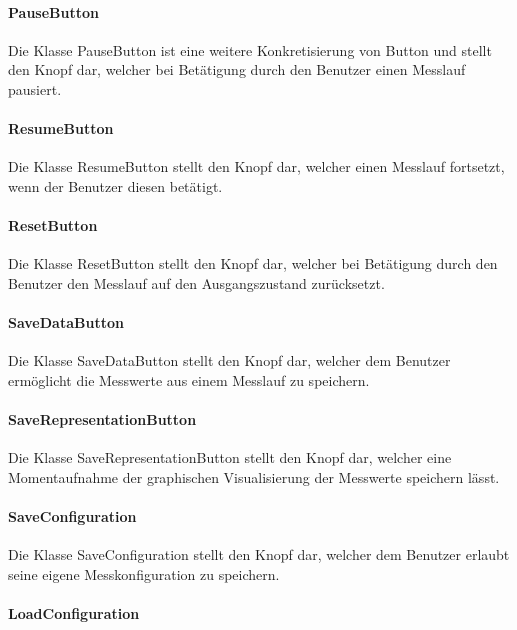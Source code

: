 \documentclass[parskip=full]{scrartcl}
\begin{document}
\paragraph{PauseButton}

Die Klasse PauseButton ist eine weitere Konkretisierung von Button und stellt den Knopf dar, welcher bei Betätigung durch den Benutzer einen Messlauf pausiert.

\paragraph{ResumeButton}

Die Klasse ResumeButton stellt den Knopf dar, welcher einen Messlauf fortsetzt, wenn der Benutzer diesen betätigt.

\paragraph{ResetButton}

Die Klasse ResetButton stellt den Knopf dar, welcher bei Betätigung durch den Benutzer den Messlauf auf den Ausgangszustand zurücksetzt.

\paragraph{SaveDataButton}

Die Klasse SaveDataButton stellt den Knopf dar, welcher dem Benutzer ermöglicht die Messwerte aus einem Messlauf zu speichern.

\paragraph{SaveRepresentationButton}

Die Klasse SaveRepresentationButton stellt den Knopf dar, welcher eine Momentaufnahme der graphischen Visualisierung der Messwerte speichern lässt.

\paragraph{SaveConfiguration}

Die Klasse SaveConfiguration stellt den Knopf dar, welcher dem Benutzer erlaubt seine eigene Messkonfiguration zu speichern.

\paragraph{LoadConfiguration} 
\end{document}
